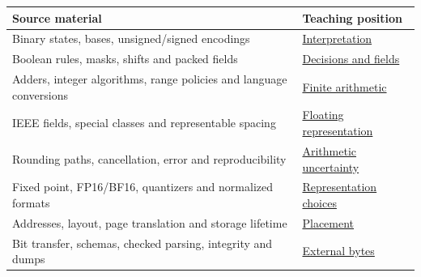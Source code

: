 {\def\LTcaptype{none} %
\begin{longtable}[]{@{}
  >{\raggedright\arraybackslash}p{}
  >{\raggedright\arraybackslash}p{}@{}}
\toprule\noalign{}
\begin{minipage}[b]{\linewidth}\raggedright
Source material
\end{minipage} & \begin{minipage}[b]{\linewidth}\raggedright
Teaching position
\end{minipage} \\
\midrule\noalign{}
\endhead
\bottomrule\noalign{}
\endlastfoot
Binary states, bases, unsigned/signed encodings & \href{Continuous\%20Notes/Computing\%20Foundations\%20-\%20From\%20Bits\%20to\%20C++\%20and\%20Systems\%20APIs\#From\%20a\%20signal\%20to\%20an\%20interpretation/}{Interpretation} \\
Boolean rules, masks, shifts and packed fields & \href{Continuous\%20Notes/Computing\%20Foundations\%20-\%20From\%20Bits\%20to\%20C++\%20and\%20Systems\%20APIs\#Bits\%20become\%20decisions\%20and\%20compact\%20fields/}{Decisions and fields} \\
Adders, integer algorithms, range policies and language conversions & \href{Continuous\%20Notes/Computing\%20Foundations\%20-\%20From\%20Bits\%20to\%20C++\%20and\%20Systems\%20APIs\#Arithmetic\%20becomes\%20a\%20policy/}{Finite arithmetic} \\
IEEE fields, special classes and representable spacing & \href{Continuous\%20Notes/Computing\%20Foundations\%20-\%20From\%20Bits\%20to\%20C++\%20and\%20Systems\%20APIs\#A\%20stretching\%20ruler\%20for\%20real-valued\%20quantities/}{Floating representation} \\
Rounding paths, cancellation, error and reproducibility & \href{Continuous\%20Notes/Computing\%20Foundations\%20-\%20From\%20Bits\%20to\%20C++\%20and\%20Systems\%20APIs\#When\%20arithmetic\%20meets\%20uncertainty/}{Arithmetic uncertainty} \\
Fixed point, FP16/BF16, quantizers and normalized formats & \href{Continuous\%20Notes/Computing\%20Foundations\%20-\%20From\%20Bits\%20to\%20C++\%20and\%20Systems\%20APIs\#Choosing\%20what\%20information\%20to\%20keep/}{Representation choices} \\
Addresses, layout, page translation and storage lifetime & \href{Continuous\%20Notes/Computing\%20Foundations\%20-\%20From\%20Bits\%20to\%20C++\%20and\%20Systems\%20APIs\#Where\%20the\%20bytes\%20live/}{Placement} \\
Bit transfer, schemas, checked parsing, integrity and dumps & \href{Continuous\%20Notes/Computing\%20Foundations\%20-\%20From\%20Bits\%20to\%20C++\%20and\%20Systems\%20APIs\#Bytes\%20become\%20a\%20durable\%20agreement/}{External bytes} \\
\end{longtable}
}

